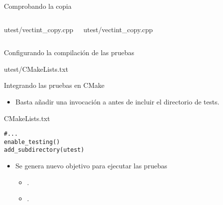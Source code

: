 \begin{frame}[t,fragile]{Comprobando la copia}
\begin{columns}[T]

\begin{block}{utest/vectint\_copy.cpp}

\end{block}

\begin{block}{utest/vectint\_copy.cpp}

\end{block}
\end{columns}
\end{frame}

\begin{frame}[t]{Configurando la compilación de las pruebas}
\begin{block}{utest/CMakeLists.txt}

\end{block}
\end{frame}

\begin{frame}[t,fragile]{Integrando las pruebas en CMake}
\begin{itemize}
  \item Basta añadir una invocación a  antes de
        incluir el directorio de tests.
\end{itemize}

\vfill
\begin{block}{CMakeLists.txt}\small
\begin{lstlisting}
#...
enable_testing()
add_subdirectory(utest)
\end{lstlisting}
\end{block}

\vfill
\begin{itemize}
  \item Se genera nuevo objetivo para ejecutar las pruebas
    \begin{itemize}
      \item {}.
      \item {}.
    \end{itemize}
\end{itemize}
\end{frame}

